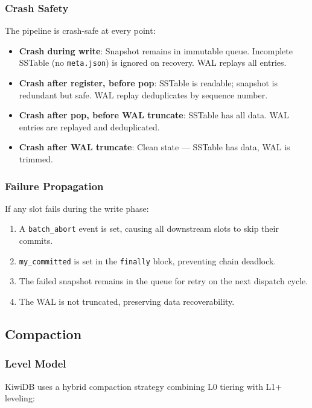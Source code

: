\documentclass[conference]{IEEEtran}
\begin{document}
\subsubsection{Crash Safety}

The pipeline is crash-safe at every point:
\begin{itemize}[leftmargin=*]
    \item \textbf{Crash during write}: Snapshot remains in immutable queue. Incomplete SSTable (no \texttt{meta.json}) is ignored on recovery. WAL replays all entries.
    \item \textbf{Crash after register, before pop}: SSTable is readable; snapshot is redundant but safe. WAL replay deduplicates by sequence number.
    \item \textbf{Crash after pop, before WAL truncate}: SSTable has all data. WAL entries are replayed and deduplicated.
    \item \textbf{Crash after WAL truncate}: Clean state --- SSTable has data, WAL is trimmed.
\end{itemize}

\subsubsection{Failure Propagation}

If any slot fails during the write phase:
\begin{enumerate}[leftmargin=*]
    \item A \texttt{batch\_abort} event is set, causing all downstream slots to skip their commits.
    \item \texttt{my\_committed} is set in the \texttt{finally} block, preventing chain deadlock.
    \item The failed snapshot remains in the queue for retry on the next dispatch cycle.
    \item The WAL is not truncated, preserving data recoverability.
\end{enumerate}

\subsection{Compaction}

\subsubsection{Level Model}

KiwiDB uses a hybrid compaction strategy combining L0 tiering with L1+ leveling:
\end{document}

